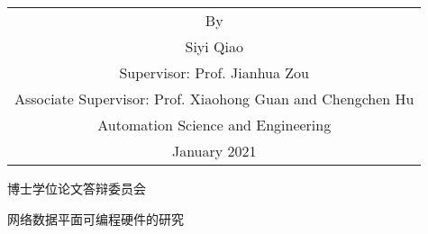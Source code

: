 \begin{titlepage}
\begin{center}
		\vspace{3cm}
		{\sanhao
			\begin{center} \renewcommand{\arraystretch}{1.5}
				\begin{tabular}{c}
					By \\
					Siyi Qiao \\
					Supervisor: Prof. Jianhua Zou \\
					Associate Supervisor: Prof.  Xiaohong Guan and Chengchen Hu\\%
					Automation Science and Engineering \\
					January 2021 \\ %
				\end{tabular} \renewcommand{\arraystretch}{1}
			\end{center} 
		}
	\end{center}
	\clearpage{\pagestyle{empty}\cleardoublepage}
	
	\newpage\thispagestyle{empty}
	\begin{center}
		\parbox[t][0.7cm][t]{\textwidth}{}
		
		\begin{center}{\boldsong 博士学位论文答辩委员会}\end{center}
		
		\vspace{1cm}
		\begin{center}{\boldsong 网络数据平面可编程硬件的研究}\end{center}
		

\end{center}
\end{titlepage}

